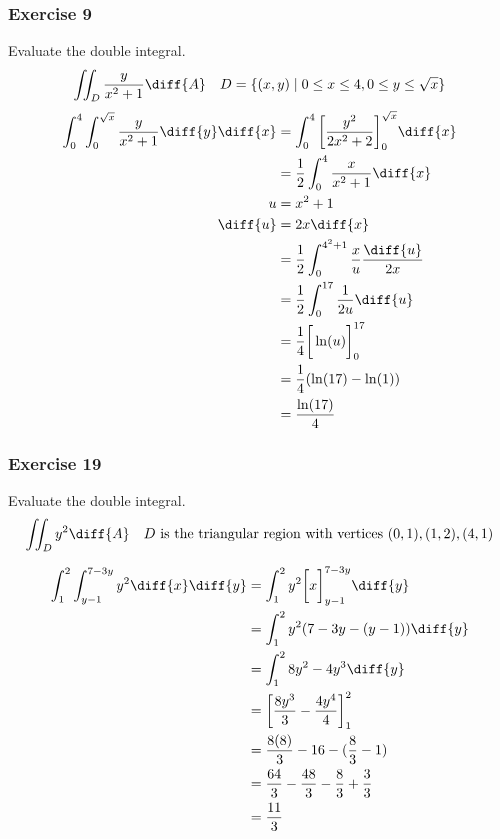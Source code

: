 \documentclass[letterpaper, 12pt]{math}
\begin{document}
\subsubsection*{Exercise 9}
Evaluate the double integral.
\[ \iint_{D}\frac{y}{x^2+1}\diff{A} \quad
    D = \{(x,y)\mid0\le x\le4,0\le y\le\sqrt{x}\} \]
\begin{align*}
  \int_{0}^{4}\int_{0}^{\sqrt{x}}\frac{y}{x^2+1}\diff{y}\diff{x}
    &= \int_{0}^{4}\bigg[\frac{y^2}{2x^2+2}\bigg]_{0}^{\sqrt{x}}\diff{x} \\
  &= \frac{1}{2}\int_{0}^{4}\frac{x}{x^2+1}\diff{x} \\
  u &= x^2+1 \\
  \diff{u} &= 2x\diff{x} \\
  &= \frac{1}{2}\int_{0}^{4^2+1}\frac{x}{u}\frac{\diff{u}}{2x} \\
  &= \frac{1}{2}\int_{0}^{17}\frac{1}{2u}\diff{u} \\
  &= \frac{1}{4}\bigg[\ln(u)\bigg]_0^{17} \\
  &= \frac{1}{4}(\ln(17)-\ln(1)) \\
  &= \frac{\ln(17)}{4}
\end{align*}

\subsubsection*{Exercise 19}
Evaluate the double integral.
\[ \iint_{D}y^2\diff{A} \quad D \text{ is the triangular region with vertices }
  (0,1), (1,2), (4,1) \]
\begin{center}
\end{center}
\begin{align*}
  \int_{1}^{2}\int_{y-1}^{7-3y}y^2\diff{x}\diff{y} &=
    \int_{1}^{2}y^2\bigg[x\bigg]_{y-1}^{7-3y}\diff{y} \\
  &= \int_{1}^{2}y^2(7-3y-(y-1))\diff{y} \\
  &= \int_{1}^{2}8y^2-4y^3\diff{y} \\
  &= \bigg[\frac{8y^3}{3}-\frac{4y^4}{4}\bigg]_{1}^{2} \\
  &= \frac{8(8)}{3}-16-(\frac{8}{3}-1) \\
  &= \frac{64}{3}-\frac{48}{3}-\frac{8}{3}+\frac{3}{3} \\
  &= \frac{11}{3}
\end{align*}
\end{document}
